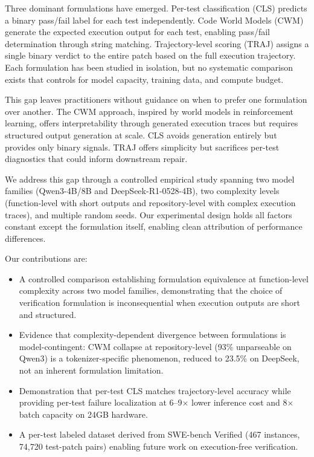 \documentclass[11pt]{article}
\begin{document}
Three dominant formulations have emerged. Per-test classification (CLS) predicts a binary pass/fail label for each test independently. Code World Models (CWM) generate the expected execution output for each test, enabling pass/fail determination through string matching. Trajectory-level scoring (TRAJ) assigns a single binary verdict to the entire patch based on the full execution trajectory. Each formulation has been studied in isolation, but no systematic comparison exists that controls for model capacity, training data, and compute budget.

This gap leaves practitioners without guidance on when to prefer one formulation over another. The CWM approach, inspired by world models in reinforcement learning, offers interpretability through generated execution traces but requires structured output generation at scale. CLS avoids generation entirely but provides only binary signals. TRAJ offers simplicity but sacrifices per-test diagnostics that could inform downstream repair.

We address this gap through a controlled empirical study spanning two model families (Qwen3-4B/8B and DeepSeek-R1-0528-4B), two complexity levels (function-level with short outputs and repository-level with complex execution traces), and multiple random seeds. Our experimental design holds all factors constant except the formulation itself, enabling clean attribution of performance differences.

Our contributions are:
\begin{itemize}
    \item A controlled comparison establishing formulation equivalence at function-level complexity across two model families, demonstrating that the choice of verification formulation is inconsequential when execution outputs are short and structured.
    \item Evidence that complexity-dependent divergence between formulations is model-contingent: CWM collapse at repository-level (93\% unparseable on Qwen3) is a tokenizer-specific phenomenon, reduced to 23.5\% on DeepSeek, not an inherent formulation limitation.
    \item Demonstration that per-test CLS matches trajectory-level accuracy while providing per-test failure localization at 6--9$\times$ lower inference cost and 8$\times$ batch capacity on 24GB hardware.
    \item A per-test labeled dataset derived from SWE-bench Verified (467 instances, 74,720 test-patch pairs) enabling future work on execution-free verification.
\end{itemize}
\end{document}
